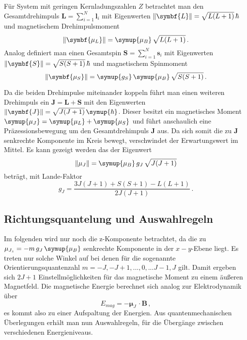 Für System mit geringen Kernladungszahlen $Z$ betrachtet man den Gesamtdrehimpuls
$\symbf{L} = \sum_{i=1}^N \symbf{l}_i$
mit Eigenwerten $\norm{\symbf{L}}=\sqrt{L(L+1)} \, \hbar$ und magnetischem
Drehimpulsmoment
\begin{equation}
\label{eq:mul}
\norm{\symbf{\mu_L}}=\symup{\mu_B} \, \sqrt{L(L+1)} \, .
\end{equation}
Analog definiert man einen Gesamtspin $\symbf{S} = \sum_{i=1}^N \symbf{s}_i$
mit Eigenwerten  $\norm{\symbf{S}} = \sqrt{S(S+1)} \, \hbar$ und magnetischem
Spinmoment
\begin{equation}
\label{eq:mus}
\norm{\symbf{\mu_S}}=\symup{g_S} \, \symup{\mu_B} \, \sqrt{S(S+1)} \, .
\end{equation}

Da die beiden Drehimpulse miteinander koppeln führt man einen weiteren
Drehimpuls ein $\symbf{J} = \symbf{L} + \symbf{S}$ mit den Eigenwerten
$\norm{\symbf{J}}=\sqrt{J(J+1)}\,\symup{\hbar}$.
Dieser besitzt ein magnetisches Moment $\symup{\mu_J}=\symup{\mu_L}+\symup{\mu_S}$
und führt anschaulich eine Präzessionsbewegung um den Gesamtdrehimpuls $\symbf{J}$
aus. Da sich somit die zu $\symbf{J}$ senkrechte Komponente im Kreis bewegt,
verschwindet der Erwartungswert im Mittel. Es kann gezeigt werden das der Eigenwert
\begin{equation}
\label{eq:muj}
\norm{\mu_J} = \symup{\mu_B} \, g_J \, \sqrt{J(J+1)}
\end{equation}
beträgt, mit Lande-Faktor
\begin{equation}
\label{eq:gj}
g_J = \frac{3J(J+1)+S(S+1)-L(L+1)}{2J(J+1)} \, .
\end{equation}

\subsection{Richtungsquantelung und Auswahlregeln}
Im folgenden wird nur noch die z-Komponente betrachtet, da die
zu $\mu_{J_z}=-m \, g_J \,\symup{\mu_B}$ senkrechte Komponente in der $x-y$-Ebene liegt.
Es treten nur solche Winkel auf bei denen für die sogenannte
Orientierungsquantenzahl $m=-J,-J+1,...,0,...J-1,J$ gilt.
Damit ergeben sich $2J+1$ Einstellmöglichkeiten für das magnetische Moment
zu einem äußeren Magnetfeld.
Die magnetische Energie berechnet sich analog zur Elektrodynamik über
\begin{equation}
\label{eq:emag}
E_{mag}=-\symbf{\mu}_J \, \cdot \symbf{B} \, ,
\end{equation}
es kommt also zu einer Aufspaltung der Energien.
Aus quantenmechanischen Überlegungen erhält man nun Auswahlregeln,
für die Übergänge zwischen verschiedenen Energieniveaus.

